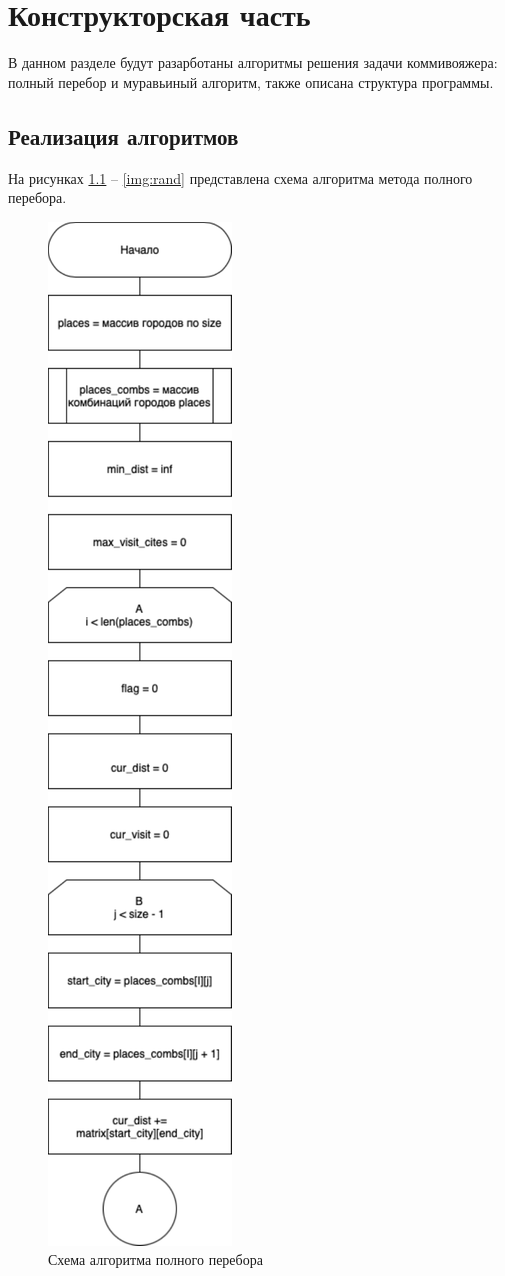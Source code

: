 \chapter{Конструкторская часть}

В данном разделе будут разарботаны алгоритмы решения задачи коммивояжера: полный
перебор и муравьиный алгоритм, также описана структура программы.

\section{Реализация алгоритмов}
На рисунках \ref{img:brute1} -- \ref{img:rand} представлена схема 
алгоритма метода полного перебора.

\begin{figure}[h]
    \centering
    \includegraphics[width=0.25\linewidth]{img/full_comb1.pdf}
    \caption{Схема алгоритма полного перебора}
    \label{img:brute1}
\end{figure}
\noindent

